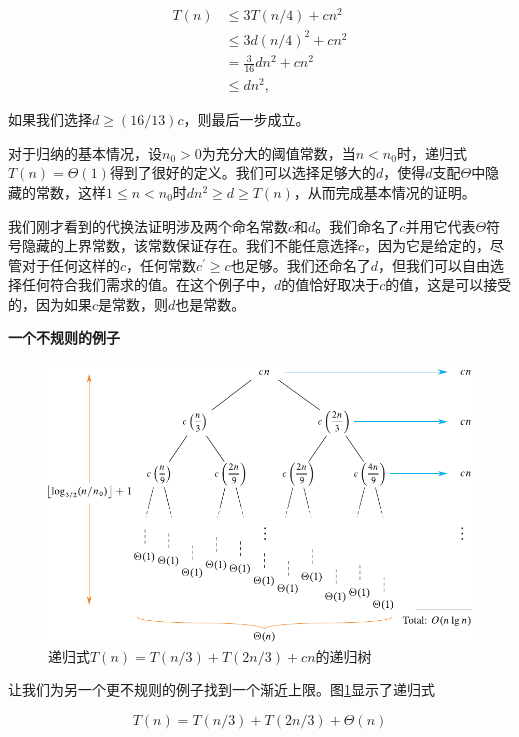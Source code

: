 \documentclass[lang=cn,newtx,10pt,scheme=chinese]{elegantbook}
\begin{document}
$$
\begin{aligned}
T(n) & \leq 3 T(n / 4)+c n^2 \\
& \leq 3 d(n / 4)^2+c n^2 \\
& =\frac{3}{16} d n^2+c n^2 \\
& \leq d n^2,
\end{aligned}
$$

如果我们选择$d \geq(16 / 13) c$，则最后一步成立。

对于归纳的基本情况，设$n_0>0$为充分大的阈值常数，当$n<n_0$时，递归式$T(n)=\Theta(1)$得到了很好的定义。我们可以选择足够大的$d$，使得$d$支配$\Theta$中隐藏的常数，这样$1 \leq n<n_0$时$d n^2 \geq d \geq T(n)$，从而完成基本情况的证明。

我们刚才看到的代换法证明涉及两个命名常数$c$和$d$。我们命名了$c$并用它代表$\Theta$符号隐藏的上界常数，该常数保证存在。我们不能任意选择$c$，因为它是给定的，尽管对于任何这样的$c$，任何常数$c^{\prime} \geq c$也足够。我们还命名了$d$，但我们可以自由选择任何符合我们需求的值。在这个例子中，$d$的值恰好取决于$c$的值，这是可以接受的，因为如果$c$是常数，则$d$也是常数。

\textbf{一个不规则的例子}

\begin{figure}
    \centering
    \includegraphics{算法导论第四版插图/第四章/4-2.pdf}
    \caption{递归式$T(n)=T(n / 3)+T(2 n / 3)+c n$的递归树}
    \label{fig:4-2}
\end{figure}

让我们为另一个更不规则的例子找到一个渐近上限。图\ref{fig:4-2}显示了递归式

\begin{equation}
T(n)=T(n / 3)+T(2 n / 3)+\Theta(n)
\end{equation}
\end{document}
